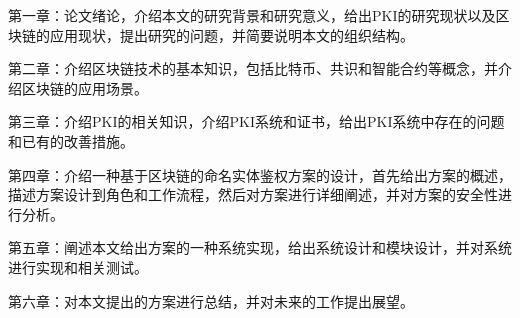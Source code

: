 第一章：论文绪论，介绍本文的研究背景和研究意义，给出PKI的研究现状以及区块链的应用现状，提出研究的问题，并简要说明本文的组织结构。

第二章：介绍区块链技术的基本知识，包括比特币、共识和智能合约等概念，并介绍区块链的应用场景。

第三章：介绍PKI的相关知识，介绍PKI系统和证书，给出PKI系统中存在的问题和已有的改善措施。

第四章：介绍一种基于区块链的命名实体鉴权方案的设计，首先给出方案的概述，描述方案设计到角色和工作流程，然后对方案进行详细阐述，并对方案的安全性进行分析。

第五章：阐述本文给出方案的一种系统实现，给出系统设计和模块设计，并对系统进行实现和相关测试。

第六章：对本文提出的方案进行总结，并对未来的工作提出展望。



